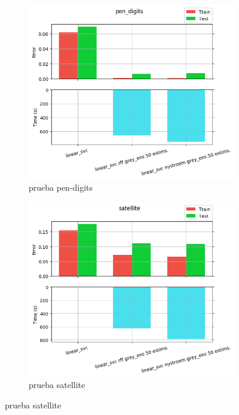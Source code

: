\begin{figure}[ht]
  \centering
  \begin{subfigure}[b]{0.5\linewidth}
    \centering\includegraphics[width=\imgscale\linewidth]{Figures/2_8/pen_digits}
    \caption{prueba pen-digits}
    \label{fig:2_8_pen_digits}
  \end{subfigure}%
  \begin{subfigure}[b]{0.5\linewidth}
    \centering\includegraphics[width=\imgscale\linewidth]{Figures/2_8/satellite}
    \caption{prueba satellite}
    \label{fig:2_8_satellite}
  \end{subfigure}
\end{figure}

